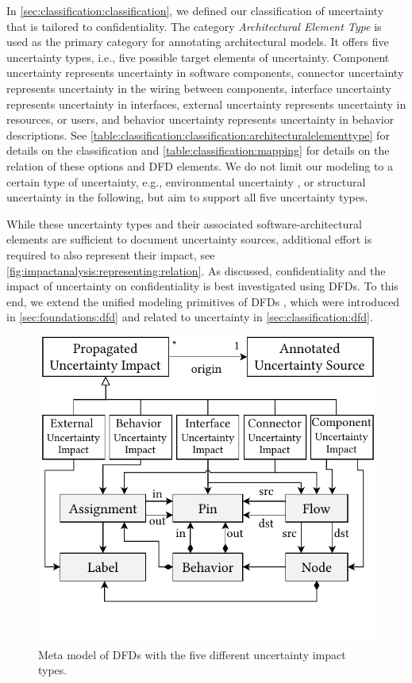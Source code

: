 In \autoref{sec:classification:classification}, we defined our classification of uncertainty that is tailored to confidentiality.
The category \emph{Architectural Element Type} is used as the primary category for annotating architectural models.
It offers five uncertainty types, i.e., five possible target elements of uncertainty.
Component uncertainty represents uncertainty in software components, connector uncertainty represents uncertainty in the wiring between components, interface uncertainty represents uncertainty in interfaces, external uncertainty represents uncertainty in resources, or users, and behavior uncertainty represents uncertainty in behavior descriptions.
See \autoref{table:classification:classification:architecturalelementtype} for details on the classification and \autoref{table:classification:mapping} for details on the relation of these options and \ac{DFD} elements.
We do not limit our modeling to a certain type of uncertainty, e.g., environmental uncertainty \cite{boltz_handling_2022}, or structural uncertainty \cite{walter_architectural_2022} in the following, but aim to support all five uncertainty types.

While these uncertainty types and their associated software-architectural elements are sufficient to document uncertainty sources, additional effort is required to also represent their impact, see \autoref{fig:impactanalysis:representing:relation}.
As discussed, confidentiality and the impact of uncertainty on confidentiality is best investigated using \acp{DFD}.
To this end, we extend the unified modeling primitives of \acp{DFD} \cite{seifermann_unified_2021}, which were introduced in \autoref{sec:foundations:dfd} and related to uncertainty in \autoref{sec:classification:dfd}.

\begin{figure}
    \centering
    \includegraphics[width=0.7\linewidth]{figures/chapter6/metamodel-uia.pdf}
    \caption{Meta model of \acfp*{DFD} with the five different uncertainty impact types.}
    \label{fig:impactanalysis:representing:metamodel}
\end{figure}

